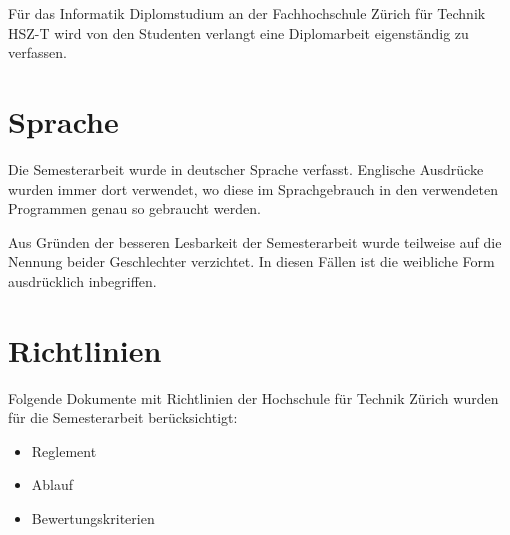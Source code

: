 Für das Informatik Diplomstudium an der Fachhochschule Zürich für Technik
HSZ-T wird von den Studenten verlangt eine Diplomarbeit eigenständig zu
verfassen.

\section{Sprache}
Die Semesterarbeit wurde in deutscher Sprache verfasst. Englische Ausdrücke 
wurden immer dort verwendet, wo diese im Sprachgebrauch in den verwendeten 
Programmen genau so gebraucht werden.

Aus Gründen der besseren Lesbarkeit der Semesterarbeit wurde teilweise auf 
die Nennung beider Geschlechter verzichtet. In diesen Fällen ist die 
weibliche Form ausdrücklich inbegriffen.
  
\section{Richtlinien}
Folgende Dokumente mit Richtlinien der Hochschule für Technik Zürich 
wurden für die Semesterarbeit berücksichtigt:

\begin{itemize}
    \item Reglement \cite{hsz_reglement}
    \item Ablauf \cite{hsz_ablauf}
    \item Bewertungskriterien \cite{hsz_bewertungskriterien}
\end{itemize}

